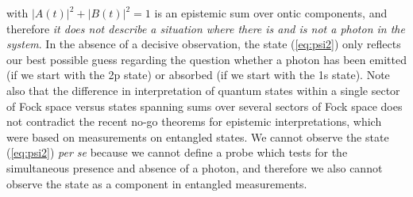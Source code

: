 \documentclass[final,3p,12pt]{elsarticle3}
\begin{document}
with $|A(t)|^2+|B(t)|^2=1$ is an epistemic sum over ontic components, and therefore
{\it it does not describe a situation where there is and is not a photon in the system}.
In the absence of a decisive observation, the state (\ref{eq:psi2}) only reflects 
our best possible guess regarding the question whether a photon has been emitted
(if we start with the 2p state) or absorbed (if we start with the 1s state). Note 
also that the difference in interpretation of quantum states within a single sector
of Fock space versus states spanning sums over several sectors of Fock space does not 
contradict the recent no-go theorems for epistemic interpretations, which were based
on measurements on entangled states. We cannot observe the 
state (\ref{eq:psi2}) {\it per se} because we cannot define a probe which
tests for the simultaneous presence and absence of a photon, and therefore
we also cannot observe the state as a component in entangled measurements. 
\end{document}
